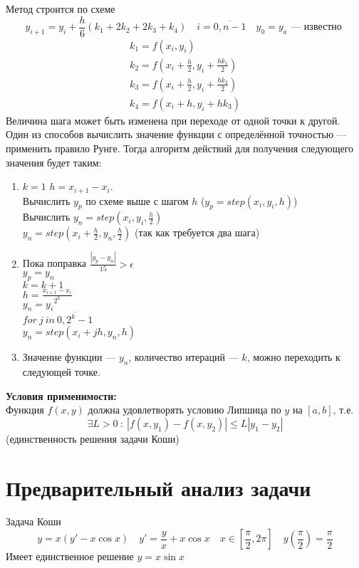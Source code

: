 \documentclass[a4paper]{article}
\begin{document}
Метод строится по схеме \[
  y_{i+1} = y_{i} + \frac{h}{6}(k_1+2k_2+2k_3+k_4) \quad i = \overline{0,n-1} \quad y_{0} = y_{a}
  \text{ --- известно }
\]\[
  \begin{matrix}
    k_1 = f(x_{i},y_{i})\\
    k_2 = f(x_{i}+\frac{h}{2}, y_{i} + \frac{h k_{1}}{2})\\
    k_3 = f(x_{i}+\frac{h}{2}, y_{i} + \frac{h k_{2}}{2})\\
    k_4 = f(x_{i}+h, y_{i} + h k_3)
  \end{matrix}
\]
Величина шага может быть изменена при переходе от одной точки к другой. Один из способов вычислить значение функции с
определённой точностью --- применить правило Рунге. Тогда алгоритм действий для получения следующего значения будет таким:
\begin{enumerate}
  \item \(k = 1\)
        \(h = x_{i+1}-x_{i}\).\\
        Вычислить \(y_{p}\) по схеме выше с шагом \(h\) (\(y_{p} = step(x_{i},y_{i},h)\))\\
        Вычислить \(y_{n} = step(x_{i},y_{i},\frac{h}{2})\)\\
        \(y_{n} = step(x_{i}+\frac{h}{2},y_{n},\frac{h}{2})\) (так как требуется два шага)\\
  \item  Пока поправка \(\frac{|y_{p}-y_{n}|}{15} > \epsilon\)\\
        \(y_{p} = y_{n}\)\\
        \(k = k+1\)\\
        \(h = \frac{x_{i+1}-x_{i}}{2^{k}}\)\\
        \(y_{n} = y_{i}\)\\
        \(for\ j\ in\ \overline{0,2^{k}-1}\)\\
        \hspace*{0.5cm}\(y_{n} = step(x_{i} + jh,y_{n}, h)\)
        \item  Значение функции --- \(y_{n}\), количество итераций --- \(k\), можно переходить к следующей точке.
\end{enumerate}
\textbf{Условия применимости:}\\
Функция \(f(x,y)\) должна удовлетворять условию Липшица по \(y\) на \([a,b]\), т.е. \[
  \exists L > 0\ :\ |f(x,y_1) - f(x,y_2)| \leq L|y_1-y_2|
\] (единственность решения задачи Коши)
\section{Предварительный анализ задачи}\label{sec:S3}
Задача Коши\[
  y = x(y' - x\cos x) \quad y' = \frac{y}{x} + x\cos x \quad x \in [\frac{\pi}{2},2\pi] \quad y(\frac{\pi}{2}) = \frac{\pi}{2}
\]
Имеет единственное решение \(y = x\sin x\)
\end{document}
